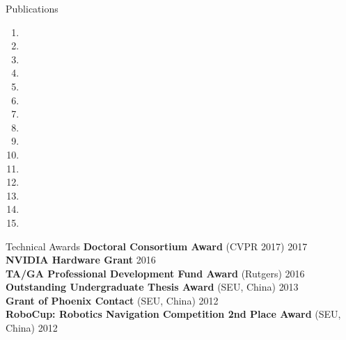 \documentclass{resume} %
\begin{document}

%
\begin{rSection}{Publications}
\begin{enumerate}

\item {}

\item {}

\item {}

\item {}

\item {}

\item {}

\item{}

\item {}

\item {}

\item{}

\item {}

\item {}

\item {}


\item {}

\item {}

\end{enumerate}
\end{rSection}



\begin{rSection}{Technical Awards}
{\bf Doctoral Consortium Award} (CVPR 2017) \hfill {2017} \\
{\bf NVIDIA Hardware Grant} \hfill{2016} \\
{\bf TA/GA Professional Development Fund Award} (Rutgers) \hfill {2016}\\ 
{\bf Outstanding Undergraduate Thesis Award} (SEU, China) \hfill {2013}\\
{\bf Grant of Phoenix Contact} (SEU, China) \hfill {2012} \\
{\bf RoboCup: Robotics Navigation Competition 2nd Place Award} (SEU, China) \hfill {2012}

\end{rSection}
\end{document}
